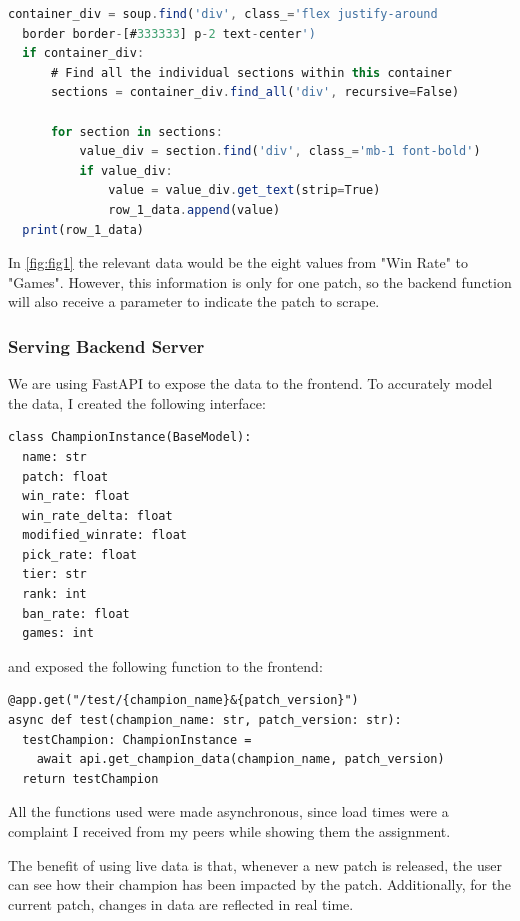 \documentclass{article}
\begin{document}
\begin{lstlisting}[language=Javascript]
  container_div = soup.find('div', class_='flex justify-around 
  border border-[#333333] p-2 text-center')
  if container_div:
      # Find all the individual sections within this container
      sections = container_div.find_all('div', recursive=False)
      
      for section in sections:
          value_div = section.find('div', class_='mb-1 font-bold')
          if value_div:
              value = value_div.get_text(strip=True)
              row_1_data.append(value)
  print(row_1_data)
\end{lstlisting}

In \autoref{fig:fig1} the relevant data would be the eight values from "Win Rate"
to "Games". However, this information is only for one patch, so the backend
function will also receive a parameter to indicate the patch to scrape.

\subsubsection{Serving Backend Server} 
\label{subsubsec:Serving Backend Server}

We are using FastAPI to expose the data to the frontend. 
To accurately model the data, I created the following interface:

\begin{lstlisting}[language=Python3]
class ChampionInstance(BaseModel):
  name: str
  patch: float
  win_rate: float
  win_rate_delta: float
  modified_winrate: float
  pick_rate: float
  tier: str
  rank: int
  ban_rate: float
  games: int
\end{lstlisting}

and exposed the following function to the frontend:

\begin{lstlisting}[language=Python3]
@app.get("/test/{champion_name}&{patch_version}")
async def test(champion_name: str, patch_version: str):
  testChampion: ChampionInstance = 
    await api.get_champion_data(champion_name, patch_version)
  return testChampion
\end{lstlisting}

All the functions used were made asynchronous, since load times were a complaint 
I received from my peers while showing them the assignment. 

The benefit of using live data is that, whenever a new patch is released, the user can see how their champion has been impacted by the patch.
Additionally, for the current patch, changes in data are reflected in real time.
\end{document}
